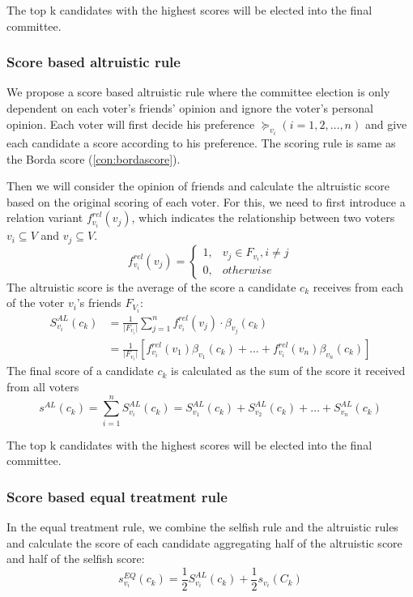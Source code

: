 \documentclass{article}
\begin{document}
The top k candidates with the highest scores will be elected into the final committee.

\subsubsection{Score based altruistic rule}
We propose a score based altruistic rule where the committee election is only dependent on each voter's friends' opinion and ignore the voter's personal opinion. 
Each voter will first decide his preference $\succeq_{v_i} (i = 1, 2, \dots , n)$ and give each candidate a score according to his preference. The scoring rule is same as the Borda score (\ref{con:bordascore}).

Then we will consider the opinion of friends and calculate the altruistic score based on the original scoring of each voter. For this, we need to first introduce a relation variant $f_{v_i}^{rel}(v_j)$, which indicates the relationship between two voters $v_i\subseteq V$ and $v_j\subseteq V$. 
 \begin{equation}
 f_{v_i}^{rel}(v_j) =\begin{cases}
        1, &v_j \in F_{v_i} ,  i \neq j\\
        0, &otherwise
        \end{cases}\label{re:RL}
\end{equation}
The altruistic score is the average of the score a candidate $c_k$ receives from each of the voter $v_i$'s friends $F_{V_i}$:
\begin{equation}
\begin{split}
S_{v_i}^{AL}(c_k) &= \frac{1}{\vert F_{v_i}\vert}\sum_{j=1}^{n} f_{v_i}^{rel}(v_j) \cdot \beta_{v_j}(c_k) \\
            &= \frac{1}{\vert F_{v_i}\vert}[f_{v_i}^{rel}(v_1)\beta_{v_1}(c_k) + \dots + f_{v_i}^{rel}(v_n)\beta_{v_n}(c_k)]\label{SB:AL_singlevoter_Score}
\end{split}
\end{equation}
The final score of a candidate $c_k$ is calculated as the sum of the score it received from all voters
\begin{equation}
s^{AL}(c_k) = \sum_{i=1}^{n} S_{v_i}^{AL}(c_k)= S_{v_1}^{AL}(c_k) + S_{v_2}^{AL}(c_k) + \dots + S_{v_n}^{AL}(c_k)\label{SB:AL_aggr_voter_Score}
\end{equation}

The top k candidates with the highest scores will be elected into the final committee.

\subsubsection{Score based equal treatment rule}
In the equal treatment rule, we combine the selfish rule and the altruistic rules and calculate the score of each candidate aggregating half of the altruistic score and half of the selfish score:
\begin{equation}
s_{v_i}^{EQ}(c_k) = \frac{1}{2}S_{v_i}^{AL}(c_k) + \frac{1}{2}s_{v_i}(C_k)\label{SB:EQ_singlevoter_Score}
\end{equation}
\end{document}
